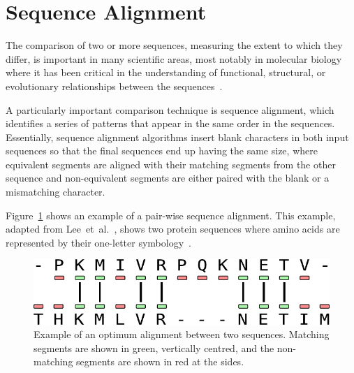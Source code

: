
\section{Sequence Alignment}

The comparison of two or more sequences, measuring the extent to which they differ, is important in many scientific areas, most notably in molecular biology~\cite{needleman70,smith81,carrillo88,wang94} where it has been critical
in the understanding of functional, structural, or evolutionary relationships between the sequences~\cite{kruskal83,mount05book}.

A particularly important comparison technique is sequence alignment, which identifies a series of patterns that appear in the same order in the sequences.
Essentially, sequence alignment algorithms insert blank characters in both input sequences so that the final sequences end up having the same size, where equivalent segments are aligned with their matching segments from the other sequence and non-equivalent segments are either paired with the blank or a mismatching character.

Figure~\ref{fig:seq-align-example} shows an example of a pair-wise sequence alignment.
This example, adapted from Lee~et~al.~\cite{lee02}, shows two protein sequences where amino acids are represented by their one-letter symbology~\cite{aasland68}.

\begin{figure}[h]
  \centering
  \includegraphics[scale=0.55]{src/background/figs/seq-align-example}
  \caption{Example of an optimum alignment between two sequences.
  Matching segments are shown in green, vertically centred, and the non-matching segments are shown in red at the sides.}
  \label{fig:seq-align-example}
\end{figure}

